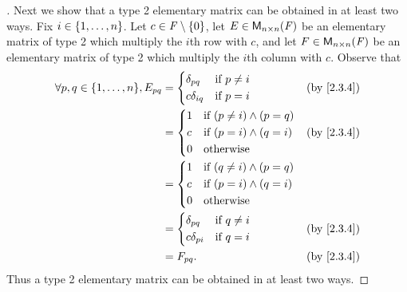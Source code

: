 \begin{proof}[]
	Next we show that a type 2 elementary matrix can be obtained in at least two ways.
	Fix \(i \in \left\lbrace1, \dots, n\right\rbrace\).
	Let \(c \in \mathit{F} \setminus \left\lbrace0\right\rbrace\), let \(E \in \ms[n][n][\F]\) be an elementary matrix of type 2 which multiply the \(i\)th row with \(c\), and let \(F \in \ms[n][n][\F]\) be an elementary matrix of type 2 which multiply the \(i\)th column with \(c\).
	Observe that
	\begin{align*}
		\forall p, q \in \set{1, \dots, n}, E_{p q} & = \begin{dcases}
			                                                \delta_{p q}   & \text{if } p \neq i \\
			                                                c \delta_{i q} & \text{if } p = i
		                                                \end{dcases}    &  & \by{2.3.4}                     \\
		                                            & = \begin{dcases}
			                                                1 & \text{if } (p \neq i) \land (p = q) \\
			                                                c & \text{if } (p = i) \land (q = i)    \\
			                                                0 & \text{otherwise}
		                                                \end{dcases} &  & \by{2.3.4}                  \\
		                                            & = \begin{dcases}
			                                                1 & \text{if } (q \neq i) \land (p = q) \\
			                                                c & \text{if } (p = i) \land (q = i)    \\
			                                                0 & \text{otherwise}
		                                                \end{dcases}                  \\
		                                            & = \begin{dcases}
			                                                \delta_{p q}   & \text{if } q \neq i \\
			                                                c \delta_{p i} & \text{if } q = i
		                                                \end{dcases}    &  & \by{2.3.4}                     \\
		                                            & = F_{p q}.                                 &  & \by{2.3.4}
	\end{align*}
	Thus a type 2 elementary matrix can be obtained in at least two ways.


\end{proof}

